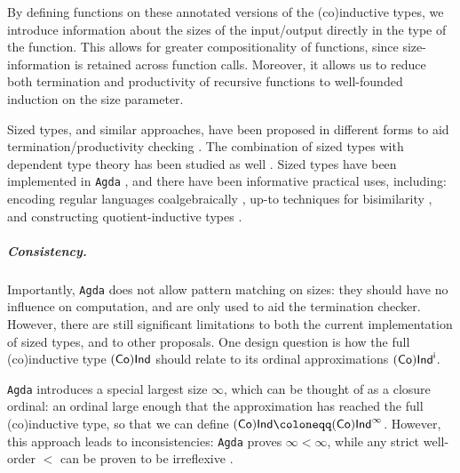 By defining functions on these annotated versions of the (co)inductive types, we introduce information about the sizes of the input/output directly in the type of the function.
This allows for greater compositionality of functions, since size-information is retained across function calls.
Moreover, it allows us to reduce both termination and productivity of recursive functions to well-founded induction on the size parameter.

Sized types, and similar approaches, have been proposed in different forms to aid  termination/productivity checking \cite{xi_sizes_2002, blanqui_sizes_2004, barthe_sizes_2004, Abel2006TypebasedTA, abel_2008}. 
The combination of sized types with dependent type theory has been studied as well \cite{Barthe, sacchini_2013, sacchini_2014, NbE, Chan_2022}.
Sized types have been implemented in \texttt{Agda} \cite{PAR-10:MiniAgda_Integrating_Sized_Dependent}, and there have been informative practical uses, including: encoding regular languages coalgebraically \cite{abel_2016}, up-to techniques for bisimilarity \cite{up-to-sized-types}, and constructing quotient-inductive types \cite{constructing-qits}.

\subparagraph*{Consistency.}
Importantly, \texttt{Agda} does not allow pattern matching on sizes: they should have no influence on computation, and are only used to aid the termination checker.
However, there are still significant limitations to both the current implementation of sized types, and to other proposals.
One design question is how the full (co)inductive type \((\sf{Co})\sf{Ind}\) should relate to its ordinal approximations \((\sf{Co})\sf{Ind}^i\).

\texttt{Agda} introduces a special largest size $\infty$, which can be thought of as a closure ordinal: an ordinal large enough that the approximation has reached the full (co)inductive type, so that we can define \((\sf{Co})\sf{Ind}\coloneqq (\sf{Co})\sf{Ind}^\infty\).
However, this approach leads to inconsistencies: \texttt{Agda} proves \(\infty<\infty\), while any strict well-order \(<\) can be proven to be irreflexive \cite{agda-issue-3026}.

